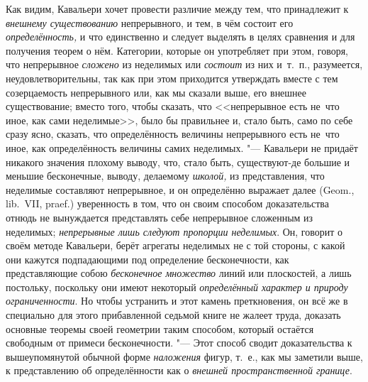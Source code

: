 Как видим, Кавальери хочет провести различие между тем, что принадлежит к
{\em внешнему существованию} непрерывного, и тем, в чём состоит его
{\em определённость,} и что единственно и следует выделять в целях сравнения и
для получения теорем о нём. Категории, которые он употребляет при этом, говоря,
что непрерывное {\em сложено} из неделимых или {\em состоит} из них и~т.~п.,
разумеется, неудовлетворительны, так как при этом приходится утверждать вместе
с тем созерцаемость непрерывного или, как мы сказали выше, его внешнее
существование; вместо того, чтобы сказать, что <<непрерывное есть не~что иное,
как сами неделимые>>, было бы правильнее и, стало быть, само по себе сразу
ясно, сказать, что определённость величины непрерывного есть не~что иное, как
определённость величины самих неделимых. "--- Кавальери не придаёт никакого
значения плохому выводу, что, стало быть, существуют-де большие и меньшие
бесконечные, выводу, делаемому {\em школой,} из представления, что неделимые
составляют непрерывное, и он определённо выражает далее (Geom., lib.~VII,
praef.) уверенность в том, что он своим способом доказательства отнюдь не
вынуждается представлять себе непрерывное сложенным из неделимых;
{\em непрерывные лишь следуют пропорции неделимых}. Он, говорит о своём методе
Кавальери, берёт агрегаты неделимых не с той стороны, с какой они кажутся
подпадающими под определение бесконечности, как представляющие собою
{\em бесконечное множество} линий или плоскостей, а лишь постольку, поскольку
они имеют некоторый {\em определённый характер и природу ограниченности}. Но
чтобы устранить и этот камень преткновения, он всё же в специально для этого
прибавленной седьмой книге не жалеет труда, доказать основные теоремы своей
геометрии таким способом, который остаётся свободным от примеси бесконечности.
"--- Этот способ сводит доказательства к вышеупомянутой обычной форме
{\em наложения} фигур, т.~е., как мы заметили выше, к представлению об
определённости как о {\em внешней пространственной границе}.

